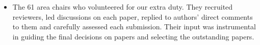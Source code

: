\begin{itemize}
\item The 61 area chairs who volunteered for our extra duty. They
  recruited reviewers, led discussions on each paper, replied to
  authors' direct comments to them and carefully assessed each
  submission.  Their input was instrumental in guiding the final
  decisions on papers and selecting the outstanding papers.
%


\end{itemize}
